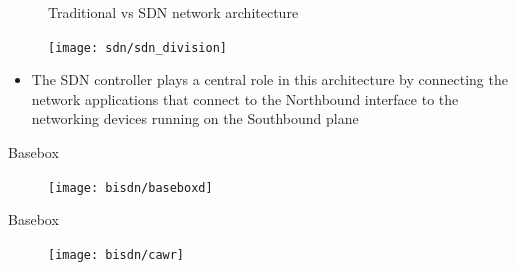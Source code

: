 \documentclass{beamer}
\begin{document}
\begin{frame}
    \begin{figure}[!tbph]
      \centering
      \caption {Traditional vs SDN network architecture}
    \end{figure}
\end{frame}

\begin{frame}
    \begin{figure}[!tbph]
        \centering
        \texttt{[image: sdn/sdn\_division]}
    \end{figure}
    \begin{itemize}
        \item The SDN controller plays a central role in this architecture by connecting the network applications that connect to the Northbound interface to the
            networking devices running on the Southbound plane
    \end{itemize}
\end{frame}


\begin{frame}{Basebox}
    \begin{figure}[!tbph]
        \centering
        \texttt{[image: bisdn/baseboxd]}
    \end{figure}

\end{frame}

\begin{frame}{Basebox}
    \begin{figure}[!tbph]
        \centering
        \texttt{[image: bisdn/cawr]}
    \end{figure}
\end{frame}
\end{document}
